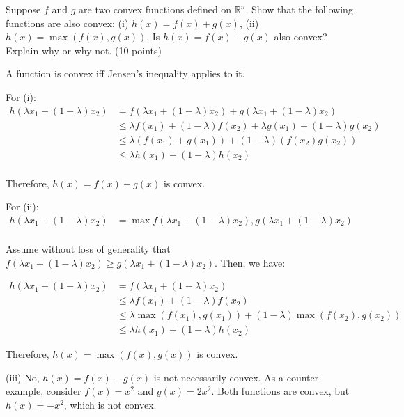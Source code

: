 \documentclass[fleqn]{homework}
\begin{document}
  \maketitle

  \begin{problem}{1}
    \begin{question}
      Suppose $f$ and $g$ are two convex functions defined on $\mathbb{R}^n$.
      Show that the following functions are also convex: (i)
      $h(x) = f(x) + g(x)$, (ii) $h(x) = \max{(f(x), g(x))}$.  Is
      $h(x) = f(x) - g(x)$ also convex?  Explain why or why not. (10 points)
    \end{question}

    A function is convex iff Jensen's inequality applies to it.

    For (i):
    \begin{align*}
      h(\lambda x_1 + (1 - \lambda) x_2) &= f(\lambda x_1 + (1 - \lambda) x_2) + g(\lambda x_1 + (1 - \lambda) x_2)\\
                                         &\leq \lambda f(x_1) + (1-\lambda)f(x_2) + \lambda g(x_1) + (1-\lambda)g(x_2)\\
                                         &\leq \lambda (f(x_1)+g(x_1)) + (1-\lambda)(f(x_2)g(x_2))\\
                                         &\leq \lambda h(x_1) + (1 - \lambda)h(x_2)\\
    \end{align*}

    Therefore, $h(x) = f(x) + g(x)$ is convex.

    For (ii):
    \begin{align*}
      h(\lambda x_1 + (1 - \lambda) x_2)
      &= \max{f(\lambda x_1 + (1 - \lambda) x_2), g(\lambda x_1 + (1 - \lambda) x_2)}\\
    \end{align*}

    Assume without loss of generality that
    $f(\lambda x_1 + (1 - \lambda) x_2) \geq g(\lambda x_1 + (1 - \lambda)
    x_2)$.  Then, we have:

    \begin{align*}
      h(\lambda x_1 + (1 - \lambda)x_2)
      &= f(\lambda x_1 + (1 - \lambda) x_2) \\
      &\leq \lambda f(x_1) + (1-\lambda) f(x_2) \\
      &\leq \lambda \max{(f(x_1),g(x_1))} + (1-\lambda)\max{(f(x_2), g(x_2))} \\
      &\leq \lambda h(x_1) + (1-\lambda)h(x_2)
    \end{align*}

    Therefore, $h(x) = \max{(f(x), g(x))}$ is convex.

    (iii) No, $h(x)=f(x)-g(x)$ is not necessarily convex.  As a counter-example,
    consider $f(x)=x^2$ and $g(x)=2x^2$.  Both functions are convex, but
    $h(x)=-x^2$, which is not convex.
  \end{problem}
\end{document}
